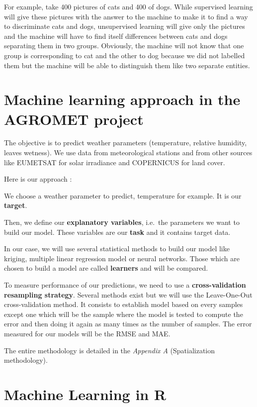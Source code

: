 \documentclass[12pt,twoside]{reedthesis}
\theoremstyle{definition}
\theoremstyle{definition}
\theoremstyle{definition}
\theoremstyle{remark}
\begin{document}
For example, take 400 pictures of cats and 400 of dogs. While supervised
learning will give these pictures with the answer to the machine to make
it to find a way to discriminate cats and dogs, unsupervised learning
will give only the pictures and the machine will have to find itself
differences between cats and dogs separating them in two groups.
Obviously, the machine will not know that one group is corresponding to
cat and the other to dog because we did not labelled them but the
machine will be able to distinguish them like two separate entities.

\section{Machine learning approach in the AGROMET
project}\label{machine-learning-approach-in-the-agromet-project}

The objective is to predict weather parameters (temperature, relative
humidity, leaves wetness). We use data from meteorological stations and
from other sources like EUMETSAT for solar irradiance and COPERNICUS for
land cover.

Here is our approach :

We choose a weather parameter to predict, temperature for example. It is
our \textbf{target}.

Then, we define our \textbf{explanatory variables}, i.e.~the parameters
we want to build our model. These variables are our \textbf{task} and it
contains target data.

In our case, we will use several statistical methods to build our model
like kriging, multiple linear regression model or neural networks. Those
which are chosen to build a model are called \textbf{learners} and will
be compared.

To measure performance of our predictions, we need to use a
\textbf{cross-validation resampling strategy}. Several methods exist but
we will use the Leave-One-Out cross-validation method. It consists to
establish model based on every samples except one which will be the
sample where the model is tested to compute the error and then doing it
again as many times as the number of samples. The error measured for our
models will be the RMSE and MAE.

The entire methodology is detailed in the \emph{Appendix A}
(Spatialization methodology).

\section{Machine Learning in R}\label{machine-learning-in-r}
\end{document}
